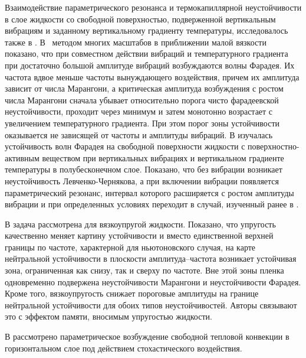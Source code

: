 \documentclass[12pt,a4paper]{article}
\begin{document}
Взаимодействие параметрического резонанса и термокапиллярной неустойчивости в слое жидкости со свободной поверхностью, подверженной вертикальным вибрациям и заданному вертикальному градиенту температуры, исследовалось также в \cite{Birikh2001, Mikishev2025}. В~\cite{Birikh2001} методом многих масштабов в приближении малой вязкости показано, что при совместном действии вибраций и температурного градиента при достаточно большой амплитуде вибраций возбуждаются волны Фарадея. Их частота вдвое меньше частоты вынуждающего воздействия, причем их амплитуда зависит от числа Марангони, а критическая амплитуда возбуждения с ростом числа Марангони сначала убывает относительно порога чисто фарадеевской неустойчивости, проходит через минимум и затем монотонно возрастает с увеличением температурного градиента. При этом порог зоны устойчивости оказывается не зависящей от частоты и амплитуды вибраций. В \cite{Mikishev2025} изучалась устойчивость волн Фарадея на свободной поверхности жидкости с поверхностно-активным веществом при вертикальных вибрациях и вертикальном градиенте температуры в полубесконечном слое. Показано, что без вибрации возникает неустойчивость Левченко-Чернякова, а при включении вибрации появляется параметрический резонанс, интервал которого расширяется с ростом амплитуды вибрации и при определенных условиях переходит в случай, изученный ранее в \cite{Birikh2001} .

В \cite{Ignatius2025} задача рассмотрена для вязкоупругой жидкости. Показано, что упругость качественно меняет картину устойчивости и вместо единственной верхней границы по частоте, характерной для ньютоновского случая, на карте нейтральной устойчивости в плоскости амплитуда--частота возникает устойчивая зона, ограниченная как снизу, так и сверху по частоте. Вне этой зоны пленка одновременно подвержена неустойчивости Марангони и неустойчивости Фарадея. Кроме того, вязкоупругость снижает пороговые амплитуды на границе нейтральной устойчивости для обоих типов неустойчивостей. Авторы связывают это с эффектом памяти, вносимым упругостью жидкости.


 В \cite{Permyakova2023} рассмотрено параметрическое возбуждение свободной тепловой конвекции в горизонтальном слое под действием стохастического воздействия. 

\end{document}
